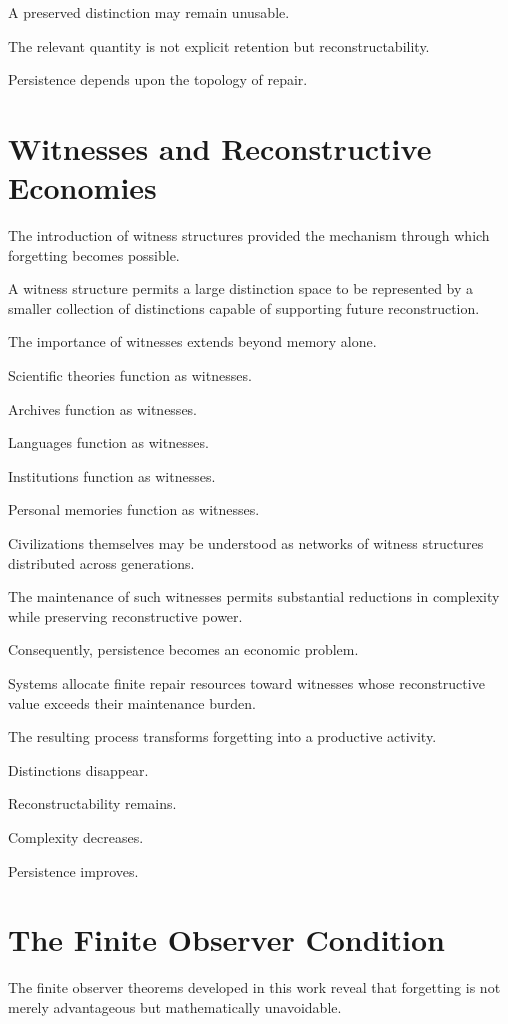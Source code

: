 \documentclass[12pt,oneside]{book}
\theoremstyle{plain} \newtheorem{theorem}{Theorem}[chapter] \newtheorem{lemma}[theorem]{Lemma} \newtheorem{proposition}[theorem]{Proposition} \newtheorem{corollary}[theorem]{Corollary}
\theoremstyle{definition} \newtheorem{definition}[theorem]{Definition} \newtheorem{axiom}[theorem]{Axiom} \newtheorem{construction}[theorem]{Construction}
\theoremstyle{remark} \newtheorem{remark}[theorem]{Remark} \newtheorem{example}[theorem]{Example}
\begin{document}
A preserved distinction may remain unusable.

The relevant quantity is not explicit retention but reconstructability.

Persistence depends upon the topology of repair.

\section{Witnesses and Reconstructive Economies}

The introduction of witness structures provided the mechanism through which forgetting becomes possible.

A witness structure permits a large distinction space to be represented by a smaller collection of distinctions capable of supporting future reconstruction.

The importance of witnesses extends beyond memory alone.

Scientific theories function as witnesses.

Archives function as witnesses.

Languages function as witnesses.

Institutions function as witnesses.

Personal memories function as witnesses.

Civilizations themselves may be understood as networks of witness structures distributed across generations.

The maintenance of such witnesses permits substantial reductions in complexity while preserving reconstructive power.

Consequently, persistence becomes an economic problem.

Systems allocate finite repair resources toward witnesses whose reconstructive value exceeds their maintenance burden.

The resulting process transforms forgetting into a productive activity.

Distinctions disappear.

Reconstructability remains.

Complexity decreases.

Persistence improves.

\section{The Finite Observer Condition}

The finite observer theorems developed in this work reveal that forgetting is not merely advantageous but mathematically unavoidable.
\end{document}
